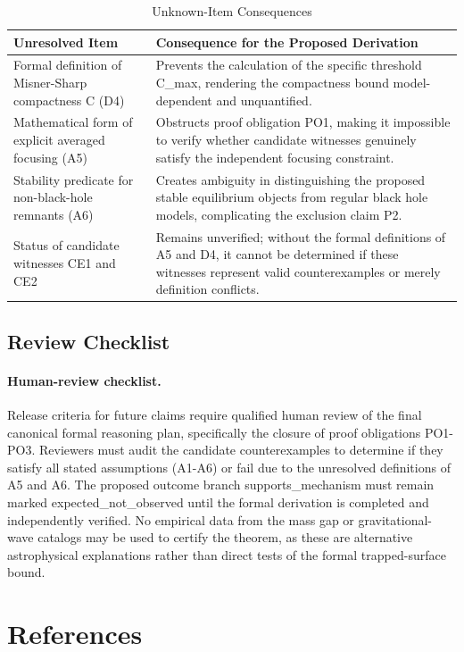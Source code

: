 \documentclass[conference]{IEEEtran}
\begin{document}
\begin{table}[htbp]
\centering
\footnotesize
\setlength{\tabcolsep}{3pt}
\renewcommand{\arraystretch}{1.12}
\caption{Unknown-Item Consequences}
\label{tab:appendix-evidence-and-review-unknown-consequences}
\begin{tabular}{|p{}|p{}|}
\hline
Unresolved Item & Consequence for the Proposed Derivation \\\hline
Formal definition of Misner-Sharp compactness C (D4) & Prevents the calculation of the specific threshold C\_max, rendering the compactness bound model-dependent and unquantified. \\\hline
Mathematical form of explicit averaged focusing (A5) & Obstructs proof obligation PO1, making it impossible to verify whether candidate witnesses genuinely satisfy the independent focusing constraint. \\\hline
Stability predicate for non-black-hole remnants (A6) & Creates ambiguity in distinguishing the proposed stable equilibrium objects from regular black hole models, complicating the exclusion claim P2. \\\hline
Status of candidate witnesses CE1 and CE2 & Remains unverified; without the formal definitions of A5 and D4, it cannot be determined if these witnesses represent valid counterexamples or merely definition conflicts. \\\hline
\end{tabular}
\end{table}

\subsection{Review Checklist}
\paragraph{Human-review checklist.} Release criteria for future claims require qualified human review of the final canonical formal reasoning plan, specifically the closure of proof obligations PO1-PO3. Reviewers must audit the candidate counterexamples to determine if they satisfy all stated assumptions (A1-A6) or fail due to the unresolved definitions of A5 and A6. The proposed outcome branch supports\_mechanism must remain marked expected\_not\_observed until the formal derivation is completed and independently verified. No empirical data from the mass gap or gravitational-wave catalogs may be used to certify the theorem, as these are alternative astrophysical explanations rather than direct tests of the formal trapped-surface bound.\section*{References}


\end{document}
